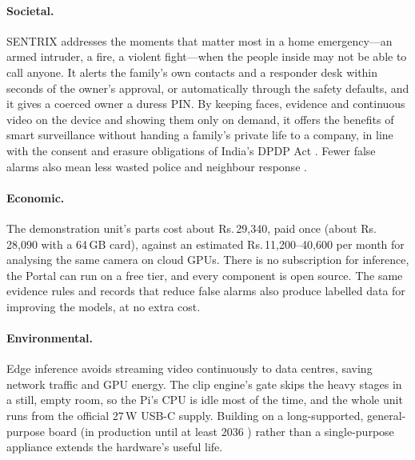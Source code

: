 \paragraph{Societal.} SENTRIX addresses the moments that matter most in a home emergency---an armed intruder, a fire, a violent fight---when the people inside may not be able to call anyone. It alerts the family's own contacts and a responder desk within seconds of the owner's approval, or automatically through the safety defaults, and it gives a coerced owner a duress PIN. By keeping faces, evidence and continuous video on the device and showing them only on demand, it offers the benefits of smart surveillance without handing a family's private life to a company, in line with the consent and erasure obligations of India's DPDP Act \cite{dpdp2023}. Fewer false alarms also mean less wasted police and neighbour response \cite{sampson2011false}.

\paragraph{Economic.} The demonstration unit's parts cost about Rs.\,29,340, paid once (about Rs.\,28,090 with a 64\,GB card), against an estimated Rs.\,11,200--40,600 per month for analysing the same camera on cloud GPUs. There is no subscription for inference, the Portal can run on a free tier, and every component is open source. The same evidence rules and records that reduce false alarms also produce labelled data for improving the models, at no extra cost.

\paragraph{Environmental.} Edge inference avoids streaming video continuously to data centres, saving network traffic and GPU energy. The clip engine's gate skips the heavy stages in a still, empty room, so the Pi's CPU is idle most of the time, and the whole unit runs from the official 27\,W USB-C supply. Building on a long-supported, general-purpose board (in production until at least 2036 \cite{rpi5brief}) rather than a single-purpose appliance extends the hardware's useful life.

